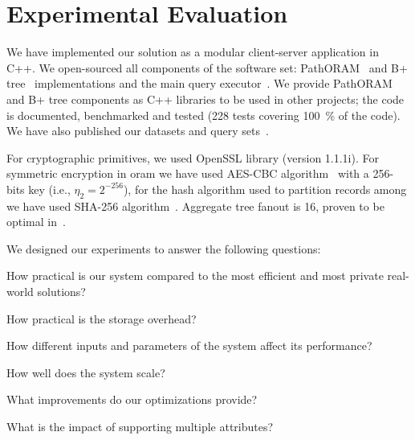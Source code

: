 \section{Experimental Evaluation}\label{section:range-persistent:experiments}

	We have implemented our solution as a modular client-server application in C++.
	We open-sourced all components of the software set: PathORAM~\cite{github-path-oram} and B+ tree~\cite{github-b-plus-tree} implementations and the main query executor~\cite{github-epsolute}.
	We provide PathORAM and B+ tree components as C++ libraries to be used in other projects; the code is documented, benchmarked and tested (228 tests covering \SI{100}{\percent} of the code).
	We have also published our datasets and query sets~\cite{our-datasets}.

	For cryptographic primitives, we used OpenSSL library (version 1.1.1i).
	For symmetric encryption in \acrshort{oram} we have used AES-CBC algorithm~\cite{nist-aes,nist-modes} with a 256-bits key (i.e., $\eta_2 = 2^{-256}$), for the hash algorithm  used to partition records among  we have used SHA-256 algorithm~\cite{nist-hash}.
	Aggregate tree fanout \fanout{} is 16, proven to be optimal in~\cite{hierarchical-methods-for-dp}.

	We designed our experiments to answer the following questions:
	\newlength{\questionLength}
	\settowidth{\questionLength}{Question-5}
	\begin{description}[
		font=\bfseries,
		leftmargin=\dimexpr\questionLength+1.0em\relax,
		labelindent=0pt,
		labelwidth=\questionLength%
	]
		\item[Question-1\label{item:question-practicality}] How practical is our system compared to the most efficient and most private real-world solutions?
		\item[Question-2\label{item:question-storage}] How practical is the storage overhead?
		\item[Question-3\label{item:question-parameters}] How different inputs and parameters of the system affect its performance?
		\item[Question-4\label{item:question-scalability}] How well does the system scale?
		\item[Question-5\label{item:question-optimizations}] What improvements do our optimizations provide?
		\item[Question-6\label{item:question-attributes}] What is the impact of supporting multiple attributes?
	\end{description}

